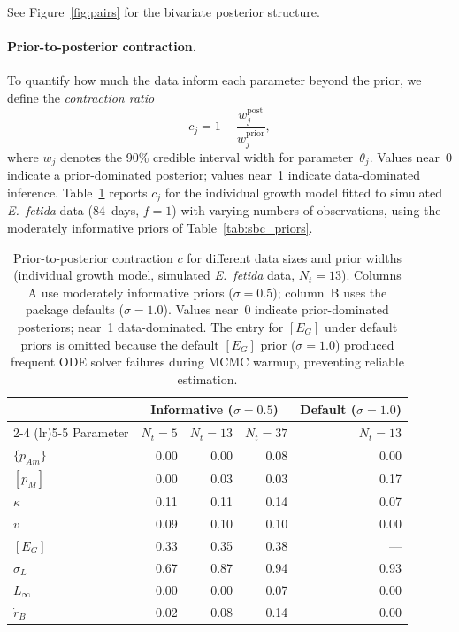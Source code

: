 \documentclass[article,shortnames]{jss}
\newcommand{\pAm}{\{p_{Am}\}}
\newcommand{\pM}{[p_M]}
\newcommand{\EG}{[E_G]}
\begin{document}
See Figure~\ref{fig:pairs} for the bivariate posterior structure.

\paragraph{Prior-to-posterior contraction.}
To quantify how much the data inform each parameter beyond the
prior, we define the \emph{contraction ratio}
\begin{equation}
  c_j = 1 - \frac{w_j^{\mathrm{post}}}{w_j^{\mathrm{prior}}},
  \label{eq:contraction}
\end{equation}
where $w_j$ denotes the 90\% credible interval width for
parameter~$\theta_j$.  Values near~0 indicate a prior-dominated
posterior; values near~1 indicate data-dominated inference.
Table~\ref{tab:contraction} reports $c_j$ for the individual growth
model fitted to simulated \emph{E.~fetida} data (84~days, $f = 1$)
with varying numbers of observations, using the moderately
informative priors of Table~\ref{tab:sbc_priors}.

\begin{table}[t!]
\centering
\caption{Prior-to-posterior contraction $c$ for different data sizes
  and prior widths (individual growth model, simulated \emph{E.~fetida}
  data, $N_t = 13$).  Columns A use moderately informative priors
  ($\sigma = 0.5$); column~B uses the package defaults
  ($\sigma = 1.0$).  Values near~0 indicate prior-dominated
  posteriors; near~1 data-dominated.  The entry for $\EG$ under
  default priors is omitted because the default $\EG$ prior
  ($\sigma = 1.0$) produced frequent ODE solver failures during
  MCMC warmup, preventing reliable estimation.}
\label{tab:contraction}
\begin{tabular}{lrrrr}
\toprule
 & \multicolumn{3}{c}{Informative ($\sigma = 0.5$)} &
   Default ($\sigma = 1.0$) \\
\cmidrule(lr){2-4} \cmidrule(lr){5-5}
Parameter & $N_t = 5$ & $N_t = 13$ & $N_t = 37$ &
  $N_t = 13$ \\
\midrule
$\pAm$          & 0.00 & 0.00 & 0.08 & 0.00 \\
$\pM$           & 0.00 & 0.03 & 0.03 & 0.17 \\
$\kappa$        & 0.11 & 0.11 & 0.14 & 0.07 \\
$v$             & 0.09 & 0.10 & 0.10 & 0.00 \\
$\EG$           & 0.33 & 0.35 & 0.38 & --- \\
$\sigma_L$      & 0.67 & 0.87 & 0.94 & 0.93 \\
\midrule
$L_\infty$      & 0.00 & 0.00 & 0.07 & 0.00 \\
$\dot{r}_B$     & 0.02 & 0.08 & 0.14 & 0.00 \\
\bottomrule
\end{tabular}
\end{table}
\end{document}
